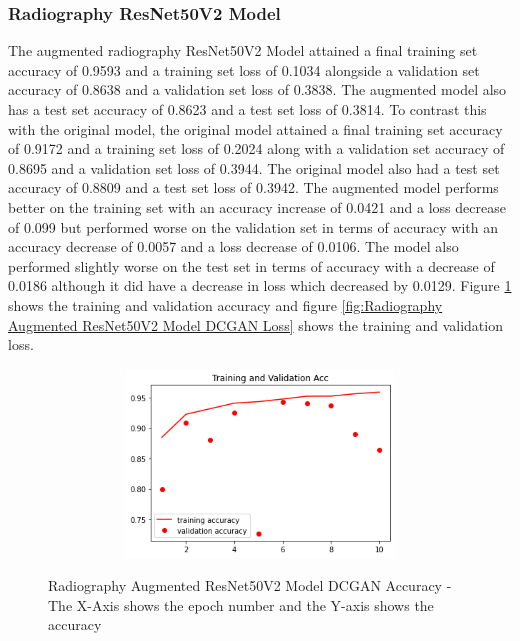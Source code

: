 \subsubsection{Radiography ResNet50V2 Model}
The augmented radiography ResNet50V2 Model attained a final training set accuracy of 0.9593 and a training set loss of 0.1034 alongside a validation set accuracy of 0.8638 and a validation set loss of 0.3838.  The augmented model also has a test set accuracy of 0.8623 and a test set loss of 0.3814.  To contrast this with the original model, the original model attained a final training set accuracy of 0.9172 and a training set loss of 0.2024 along with a validation set accuracy of 0.8695 and a validation set loss of 0.3944.  The original model also had a test set accuracy of 0.8809 and a test set loss of 0.3942.  The augmented model performs better on the training set with an accuracy increase of 0.0421 and a loss decrease of 0.099 but performed worse on the validation set in terms of accuracy with an accuracy decrease of 0.0057 and a loss decrease of 0.0106.   The model also performed slightly worse on the test set in terms of accuracy with a decrease of 0.0186 although it did have a decrease in loss which decreased by 0.0129. Figure \ref{fig:Radiography Augmented ResNet50V2 Model DCGAN Accuracy} shows the training and validation accuracy and figure \ref{fig:Radiography Augmented ResNet50V2 Model DCGAN Loss} shows the training and validation loss.
 \begin{figure}[H]
    \centering    
    \includegraphics[width=1\textwidth,height=5cm,keepaspectratio]{Images/RadiographyCNNResNet50V2TrainAndValAccAugmentedDCGAN.png}\\
    \caption{Radiography Augmented ResNet50V2 Model DCGAN Accuracy - The X-Axis shows the epoch number and the Y-axis shows the accuracy}
    \label{fig:Radiography Augmented ResNet50V2 Model DCGAN Accuracy}
\end{figure}
